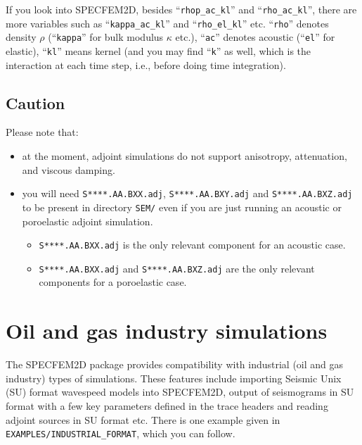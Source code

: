 \documentclass[oneside,english,onecolumn,letterpaper]{book}
\begin{document}
If you look into SPECFEM2D, besides ``\texttt{rhop\_ac\_kl}'' and ``\texttt{rho\_ac\_kl}'',
there are more variables such as ``\texttt{kappa\_ac\_kl}'' and ``\texttt{rho\_el\_kl}'' etc.
``\texttt{rho}'' denotes density $\rho$ (``\texttt{kappa}'' for bulk modulus $\kappa$ etc.),
``\texttt{ac}'' denotes acoustic (``\texttt{el}'' for elastic),
``\texttt{kl}'' means kernel (and you may find ``\texttt{k}'' as well, which is the interaction at each time step, i.e., before doing time integration).

\section{Caution}

Please note that:
%
\begin{itemize}
\item at the moment, adjoint simulations do not support anisotropy, attenuation, and viscous damping.

\item you will need \texttt{S****.AA.BXX.adj}, \texttt{S****.AA.BXY.adj} and \texttt{S****.AA.BXZ.adj}
to be present in directory \texttt{SEM/} even if you are just running an acoustic or
poroelastic adjoint simulation.
  \begin{itemize}
    \item \texttt{S****.AA.BXX.adj} is the only relevant component for an acoustic case.
    \item \texttt{S****.AA.BXX.adj} and \texttt{S****.AA.BXZ.adj} are the only relevant components for a
poroelastic case.
  \end{itemize}
\end{itemize}



\chapter{Oil and gas industry simulations}


The SPECFEM2D package provides compatibility with industrial (oil and gas industry) types of simulations.
These features include importing Seismic Unix (SU) format wavespeed models into SPECFEM2D,
output of seismograms in SU format with a few key parameters defined in the trace headers
and reading adjoint sources in SU format etc.
There is one example given in \texttt{EXAMPLES/INDUSTRIAL\_FORMAT}, which you can follow.
\end{document}
